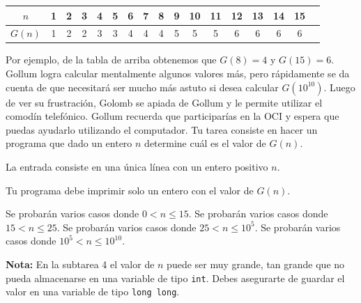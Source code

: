\documentclass{oci}
\begin{document}
\begin{problemDescription}
\begin{center}
  \begin{tabular}{c|cccccccccccccccc}
	$n$ & 1 & 2 & 3 & 4 & 5 & 6 & 7 & 8 & 9 & 10 & 11 & 12 & 13 & 14 & 15 \\
  \hline
	$G(n)$ & 1 & 2 & 2 & 3 & 3 & 4 & 4 & 4 & 5 & 5 & 5 & 6 & 6 & 6 & 6 
  \end{tabular}
\end{center}
Por ejemplo, de la tabla de arriba obtenemos que $G(8)=4$ y $G(15)=6$. 
Gollum logra calcular mentalmente algunos valores más, pero rápidamente se da cuenta de que necesitará 
ser mucho más astuto si desea calcular $G(10^{10})$.
Luego de ver su frustración, Golomb se apiada de Gollum y le permite utilizar el comodín telefónico.
Gollum recuerda que participarías en la OCI y espera que puedas ayudarlo utilizando el computador.
Tu tarea consiste en hacer un programa que dado un entero $n$ determine cuál es el valor de $G(n)$.
\end{problemDescription}

\begin{inputDescription}
  La entrada consiste en una única línea con un entero positivo $n$.
\end{inputDescription}

\begin{outputDescription}
  Tu programa debe imprimir solo un entero con el valor de $G(n)$.
\end{outputDescription}

\begin{scoreDescription}
   Se probarán varios casos donde $0 < n \leq 15$.
   Se probarán varios casos donde $15 < n \leq 25$.
   Se probarán varios casos donde $25 < n \leq 10^5$.
   Se probarán varios casos donde $10^{5} < n \leq 10^{10}$.
\end{scoreDescription}
\textbf{Nota:} En la subtarea 4 el valor de $n$ puede ser muy grande, tan grande que no pueda almacenarse 
en una variable de tipo \texttt{int}. Debes asegurarte de guardar el valor en una variable de tipo \texttt{long long}.

\begin{sampleDescription}
\end{sampleDescription}
\end{document}
